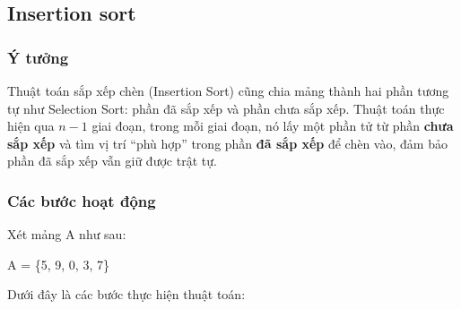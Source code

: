 \subsection{Insertion sort}

\subsubsection{Ý tưởng}

Thuật toán sắp xếp chèn (Insertion Sort) cũng chia mảng thành hai phần tương tự như Selection Sort: phần đã sắp xếp và phần chưa sắp xếp. Thuật toán thực hiện qua $n - 1$ giai đoạn, trong mỗi giai đoạn, nó lấy một phần tử từ phần \textbf{chưa sắp xếp} và tìm vị trí “phù hợp” trong phần \textbf{đã sắp xếp} để chèn vào, đảm bảo phần đã sắp xếp vẫn giữ được trật tự.

\subsubsection{Các bước hoạt động}
Xét mảng A như sau: 
\begin{center}
   A = \{5, 9, 0, 3, 7\} 
\end{center} 
Dưới đây là các bước thực hiện thuật toán:


